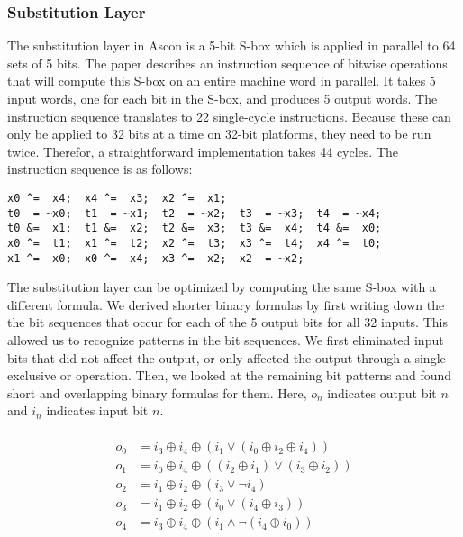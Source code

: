 \subsubsection{Substitution Layer}

The substitution layer in Ascon is a 5-bit S-box which is applied in
parallel to 64 sets of 5 bits. The paper describes an instruction
sequence of bitwise operations that will compute this S-box on an entire
machine word in parallel. It takes 5 input words, one for each bit in
the S-box, and produces 5 output words. The instruction sequence
translates to 22 single-cycle instructions. Because these can only be
applied to 32 bits at a time on 32-bit platforms, they need to be run
twice. Therefor, a straightforward implementation takes 44 cycles. The
instruction sequence is as follows:

\begin{verbatim}
x0 ^=  x4;  x4 ^=  x3;  x2 ^=  x1;
t0  = ~x0;  t1  = ~x1;  t2  = ~x2;  t3  = ~x3;  t4  = ~x4;
t0 &=  x1;  t1 &=  x2;  t2 &=  x3;  t3 &=  x4;  t4 &=  x0;
x0 ^=  t1;  x1 ^=  t2;  x2 ^=  t3;  x3 ^=  t4;  x4 ^=  t0;
x1 ^=  x0;  x0 ^=  x4;  x3 ^=  x2;  x2  = ~x2;
\end{verbatim}

The substitution layer can be optimized by computing the same S-box with
a different formula. We derived shorter binary formulas by first writing
down the the bit sequences that occur for each of the 5 output bits for
all 32 inputs. This allowed us to recognize patterns in the bit
sequences. We first eliminated input bits that did not affect the
output, or only affected the output through a single exclusive or
operation. Then, we looked at the remaining bit patterns and found short
and overlapping binary formulas for them. Here, \(o_n\) indicates output
bit \(n\) and \(i_n\) indicates input bit \(n\).

\begin{align}
\\ o_0 & = i_3 \oplus i_4 \oplus (i_1 \vee (i_0 \oplus i_2 \oplus i_4))
\\ o_1 & = i_0 \oplus i_4 \oplus ((i_2 \oplus i_1) \vee (i_3 \oplus i_2))
\\ o_2 & = i_1 \oplus i_2 \oplus (i_3 \vee \neg i_4)
\\ o_3 & = i_1 \oplus i_2 \oplus (i_0 \vee (i_4 \oplus i_3))
\\ o_4 & = i_3 \oplus i_4 \oplus (i_1 \wedge \neg (i_4 \oplus i_0))
\end{align}
